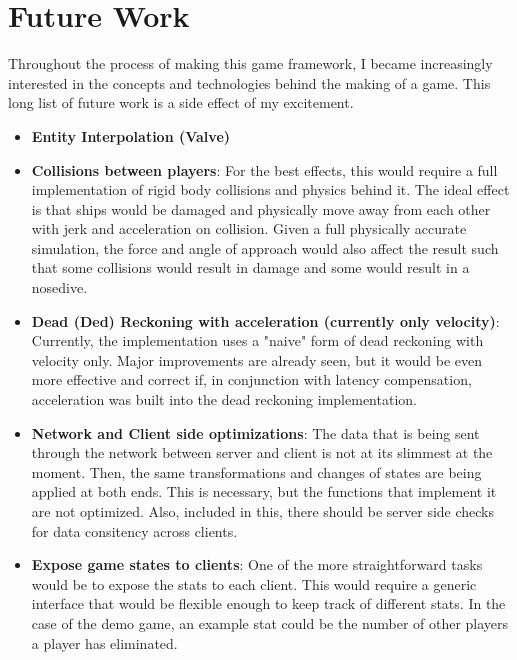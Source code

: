 \documentclass{acmsiggraph}
\begin{document}
\section{Future Work}
Throughout the process of making this game framework, I became increasingly interested in the concepts and technologies behind the making of a game. This long list of future work is a side effect of my excitement.
\begin{itemize}
    \item{\textbf{Entity Interpolation (Valve)}}
    \item{\textbf{Collisions between players}: For the best effects, this would require a full implementation of rigid body collisions and physics behind it. The ideal effect is that ships would be damaged and physically move away from each other with jerk and acceleration on collision. Given a full physically accurate simulation, the force and angle of approach would also affect the result such that some collisions would result in damage and some would result in a nosedive.}
    \item{\textbf{Dead (Ded) Reckoning with acceleration (currently only velocity)}: Currently, the implementation uses a "naive" form of dead reckoning with velocity only. Major improvements are already seen, but it would be even more effective and correct if, in conjunction with latency compensation, acceleration was built into the dead reckoning implementation.}
    \item{\textbf{Network and Client side optimizations}: The data that is being sent through the network between server and client is not at its slimmest at the moment. Then, the same transformations and changes of states are being applied at both ends. This is necessary, but the functions that implement it are not optimized. Also, included in this, there should be server side checks for data consitency across clients.}
    \item{\textbf{Expose game states to clients}: One of the more straightforward tasks would be to expose the stats to each client. This would require a generic interface that would be flexible enough to keep track of different stats. In the case of the demo game, an example stat could be the number of other players a player has eliminated.}

\end{itemize}
\end{document}
